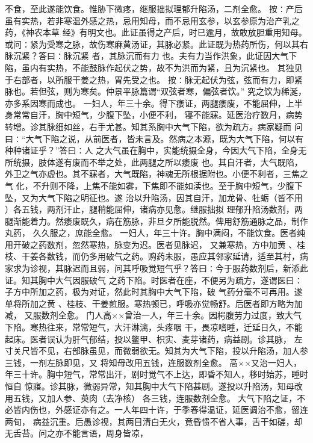 \documentclass[a4paper,12pt,UTF8,twoside]{ctexbook}
\begin{document}
不食，至此遂能饮食。惟胁下微疼，继服拙拟理郁升陷汤，二剂全愈。 
按∶产后虽有实热，若非寒温外感之热，忌用知母，而不忌用玄参，以玄参原为治产乳之药，《神农本草 
经》有明文也。此证虽得之产后，时已逾月，故敢放胆重用知母。 
或问∶紧为受寒之脉，故伤寒麻黄汤证，其脉必紧。此证既为热药所伤，何以其右脉沉紧？答曰∶脉沉紧 
者，其脉沉而有力 
也。夫有力当作洪象，此证因大气下陷，虽内有实热，不能鼓脉作起伏之势，故不为洪而为紧，且为沉紧也。 
其独见于右部者，以所服干姜之热，胃先受之也。 
按∶脉无起伏为弦，弦而有力，即紧脉也。若但弦，则为寒矣。仲景平脉篇谓“双弦者寒，偏弦者饮。” 
究之饮为稀涎，亦多系因寒而成也。 
一妇人，年三十余。得下痿证，两腿痿废，不能屈伸，上半身常常自汗，胸中短气，少腹下坠，小便不利， 
寝不能寐。延医治疗数月，病势转增。诊其脉细如丝，右手尤甚。知其系胸中大气下陷，欲为疏方。病家疑而 
问曰∶“大气下陷之说，从前医者，皆未言及。然病之本源，既为大气下陷，何以有种种诸证乎？”答曰∶人 
之大气虽在胸中，实能统摄全身，今因大气下陷，全身无所统摄，肢体遂有废而不举之处，此两腿之所以痿废 
也。其自汗者，大气既陷，外卫之气亦虚也。其不寐者，大气既陷，神魂无所根据附也。小便不利者，三焦之气 
化，不升则不降，上焦不能如雾，下焦即不能如渎也。至于胸中短气，少腹下坠，又为大气下陷之明征也。遂 
治以升陷汤，因其自汗，加龙骨、牡蛎（皆不用 ）各五钱，两剂汗止，腿稍能屈伸，诸病亦见愈。继服拙拟 
理郁升陷汤数剂，两腿渐能着力。然痿废既久，病在筋脉，非旦夕所能脱然。俾用舒筋通脉之品，制作丸药， 
久久服之，庶能全愈。 
一妇人，年三十许。胸中满闷，不能饮食。医者纯用开破之药数剂，忽然寒热，脉变为迟。医者见脉迟， 
又兼寒热，方中加黄 、桂枝、干姜各数钱，而仍多用破气之药。购药未服，愚应其邻家延请，适至其村，病 
家求为诊视，其脉迟而且弱，问其呼吸觉短气乎？答曰∶今于服药数剂后，新添此证。知其胸中大气因服破气 
之药下陷。时医者在座，不便另为疏方，遂谓医曰∶子方中所加之药，极为对证，然此时其胸中大气下陷，破 
气药分毫不可再用。遂单将所加之黄 、桂枝、干姜煎服。寒热顿已，呼吸亦觉畅舒。后医者即方略为加减， 
又服数剂全愈。 
门人高××曾治一人，年三十余。因枵腹劳力过度，致大气下陷。寒热往来，常常短气，大汗淋漓，头疼咽 
干，畏凉嗜睡，迁延日久，不能起床。医者误认为肝气郁结，投以鳖甲、枳实、麦芽诸药，病益剧。诊其脉， 
左寸关尺皆不见，右部脉虽见，而微弱欲无。知其为大气下陷，投以升陷汤，加人参三钱，一剂左脉即见，又 
将知母改用五钱，连服数剂全愈。 
高××又治一妇人，年三十许。胸中短气，常常出汗，剧时觉气不上达，即昏不知人，移时始苏，睡时恒自 
惊寤。诊其脉，微弱异常，知其胸中大气下陷甚剧。遂投以升陷汤，知母改用五钱，又加人参、萸肉（去净核） 
各三钱，连服数剂全愈。 
大气下陷之证，不必皆内伤也，外感证亦有之。一人年四十许，于季春得温证，延医调治不愈，留连两旬， 
病益沉重。后愚诊视，其两目清白无火，竟昏愦不省人事，舌干如磋，却无舌苔。问之亦不能言语，周身皆凉， 
\end{document}
